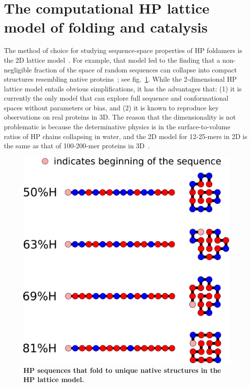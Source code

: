 \documentclass[journal=jacsat,manuscript=article,layout=twocolumn]{achemso}
\begin{document}
\section{The computational HP lattice model of folding and catalysis}

 The method of choice for studying sequence-space properties of HP foldamers is the 2D lattice 
model~\cite{lau1989lattice,Chan1991}.  For example, that model led to the finding that a 
non-negligible fraction of the space of random sequences can collapse into compact structures 
resembling native proteins~\cite{lau1989lattice}; see fig.~\ref{fig:hydro-effect}.  While the 
2-dimensional HP lattice model entails obvious simplifications, it has the advantages that: (1) it 
is currently the only model that can explore full sequence and conformational spaces without 
parameters or bias, and (2) it is known to reproduce key observations on real proteins in 3D. The 
reason that the dimensionality is not problematic is because the determinative physics is in the 
surface-to-volume ratios of HP chains collapsing in water, and the 2D model for 12-25-mers in 2D is 
the same as that of 100-200-mer proteins in 3D~\cite{Giugliarelli2000}.
 
\begin{figure}[h!]
  \centering
  \includegraphics[width=\columnwidth]{pictures/tst-seqs.pdf} 
  \caption{\footnotesize{\textbf{HP sequences that fold to unique native structures in the HP 
lattice model.}}}
  \label{fig:hydro-effect}
\end{figure}
\end{document}
